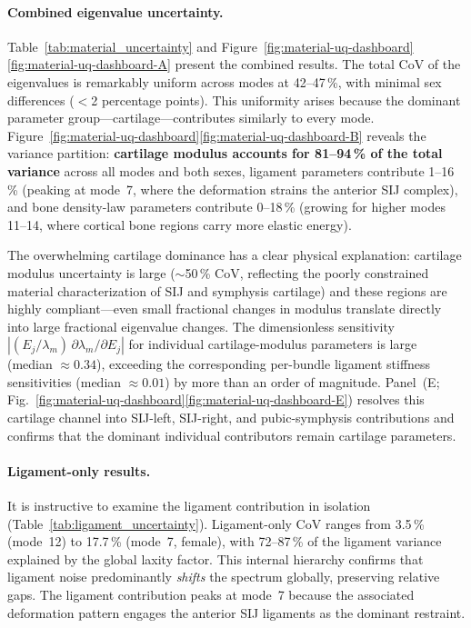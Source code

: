\documentclass[11pt]{article}
\begin{document}
\paragraph{Combined eigenvalue uncertainty.}
Table~\ref{tab:material_uncertainty} and Figure~\ref{fig:material-uq-dashboard}\ref{fig:material-uq-dashboard-A} present the combined results.
The total CoV of the eigenvalues is remarkably uniform across modes at 42--47\,\%, with minimal sex differences ($<$2 percentage points).
This uniformity arises because the dominant parameter group---cartilage---contributes similarly to every mode.
Figure~\ref{fig:material-uq-dashboard}\ref{fig:material-uq-dashboard-B} reveals the variance partition: \textbf{cartilage modulus accounts for 81--94\,\% of the total variance} across all modes and both sexes, ligament parameters contribute 1--16\,\% (peaking at mode~7, where the deformation strains the anterior SIJ complex), and bone density-law parameters contribute 0--18\,\% (growing for higher modes 11--14, where cortical bone regions carry more elastic energy).

The overwhelming cartilage dominance has a clear physical explanation: cartilage modulus uncertainty is large ($\sim$50\,\% CoV, reflecting the poorly constrained material characterization of SIJ and symphysis cartilage) and these regions are highly compliant---even small fractional changes in modulus translate directly into large fractional eigenvalue changes.
The dimensionless sensitivity $|(E_j/\lambda_m)\,\partial\lambda_m/\partial E_j|$ for individual cartilage-modulus parameters is large (median $\approx 0.34$), exceeding the corresponding per-bundle ligament stiffness sensitivities (median $\approx 0.01$) by more than an order of magnitude.
Panel~(E; Fig.~\ref{fig:material-uq-dashboard}\ref{fig:material-uq-dashboard-E}) resolves this cartilage channel into SIJ-left, SIJ-right, and pubic-symphysis contributions and confirms that the dominant individual contributors remain cartilage parameters.

\paragraph{Ligament-only results.}
It is instructive to examine the ligament contribution in isolation (Table~\ref{tab:ligament_uncertainty}).
Ligament-only CoV ranges from 3.5\,\% (mode~12) to 17.7\,\% (mode~7, female), with 72--87\,\% of the ligament variance explained by the global laxity factor.
This internal hierarchy confirms that ligament noise predominantly \emph{shifts} the spectrum globally, preserving relative gaps.
The ligament contribution peaks at mode~7 because the associated deformation pattern engages the anterior SIJ ligaments as the dominant restraint.
\end{document}
